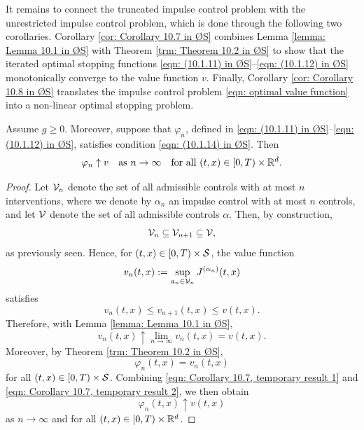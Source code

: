 It remains to connect the truncated impulse control problem with the unrestricted impulse control problem, which is done through the following two corollaries. Corollary \ref{cor: Corollary 10.7 in ØS} combines Lemma \ref{lemma: Lemma 10.1 in ØS} with Theorem \ref{trm: Theorem 10.2 in ØS} to show that the iterated optimal stopping functions \eqref{eqn: (10.1.11) in ØS}--\eqref{eqn: (10.1.12) in ØS} monotonically converge to the value function $v$. Finally, Corollary \ref{cor: Corollary 10.8 in ØS} translates the impulse control problem \eqref{eqn: optimal value function} into a non-linear optimal stopping problem.
\begin{corollary}
\label{cor: Corollary 10.7 in ØS}
    Assume $g\geq 0$. Moreover, suppose that $\varphi_n$, defined in \eqref{eqn: (10.1.11) in ØS}--\eqref{eqn: (10.1.12) in ØS}, satisfies condition \eqref{eqn: (10.1.14) in ØS}. Then
    \begin{equation*}
        \varphi_n \uparrow v \quad \text{as } n \rightarrow \infty \quad \text{for all } (t,x) \in [0,T) \times \mathbb{R}^d. 
    \end{equation*}
\end{corollary}
\begin{proof}
    Let $\mathcal{V}_n$ denote the set of all admissible controls with at most $n$ interventions, where we denote by $\alpha_n$ an impulse control with at most $n$ controls, and let $\mathcal{V}$ denote the set of all admissible controls $\alpha$. Then, by construction,
    \begin{equation*}
        \mathcal{V}_n \subseteq \mathcal{V}_{n+1} \subseteq \mathcal{V},
    \end{equation*}
    as previously seen. Hence, for $(t,x) \in [0,T) \times \mathcal{S}$, the value function
    \begin{equation*}
        v_n(t,x) := \sup_{a_n \in \mathcal{V}_n} J^{(\alpha_n)}(t,x)
    \end{equation*}
    satisfies
    \begin{equation*}
        v_n(t,x) \leq v_{n+1}(t,x) \leq v(t,x).
    \end{equation*}
    Therefore, with Lemma \ref{lemma: Lemma 10.1 in ØS}, 
    \begin{equation}
        v_n(t,x) \uparrow \lim_{n \rightarrow \infty} v_n(t,x) = v(t,x).
        \label{eqn: Corollary 10.7, temporary result 1}
    \end{equation}
    Moreover, by Theorem \ref{trm: Theorem 10.2 in ØS}, 
    \begin{equation}
        \varphi_n(t,x) = v_n(t,x)
        \label{eqn: Corollary 10.7, temporary result 2}
    \end{equation}
    for all $(t,x) \in [0,T) \times \mathcal{S}$. Combining \eqref{eqn: Corollary 10.7, temporary result 1} and \eqref{eqn: Corollary 10.7, temporary result 2}, we then obtain
    \begin{equation*}
        \varphi_n(t,x) \uparrow v(t,x)
    \end{equation*}
    as $n \rightarrow \infty$ and for all $(t,x) \in [0,T) \times \mathbb{R}^d$.
\end{proof}
